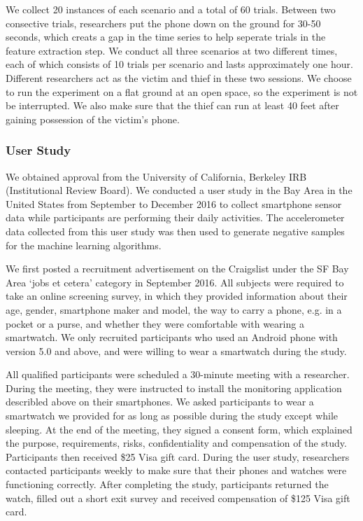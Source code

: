 \documentclass{soups}
\begin{document}
We collect 20 instances of each scenario and a total of 60 trials. Between two consective trials, researchers put the phone down on the ground for 30-50 seconds, which creats a gap in the time series to help seperate trials in the feature extraction step. We conduct all three scenarios at two different times, each of which consists of 10 trials per scenario and lasts approximately one hour. Different researchers act as the victim and thief in these two sessions. We choose to run the experiment on a flat ground at an open space, so the experiment is not be interrupted. We also make sure that the thief can run at least 40 feet after gaining possession of the victim's phone.



\subsubsection{User Study}
We obtained approval from the University of California, Berkeley IRB (Institutional Review Board). We conducted a user study in the Bay Area in the United States from September to December 2016 to collect smartphone sensor data while participants are performing their daily activities. The accelerometer data collected from this user study was then used to generate negative samples for the machine learning algorithms.

We first posted a recruitment advertisement on the Craigslist under the SF Bay Area `jobs et cetera' category in September 2016. All subjects were required to take an online screening survey, in which they provided information about their age, gender, smartphone maker and model, the way to carry a phone, e.g. in a pocket or a purse, and whether they were comfortable with wearing a smartwatch. We only recruited participants who used an Android phone with version 5.0 and above, and were willing to wear a smartwatch during the study.

All qualified participants were scheduled a 30-minute meeting with a researcher. During the meeting, they were instructed to install the monitoring application describled above on their smartphones. We asked participants to wear a smartwatch we provided for as long as possible during the study except while sleeping. At the end of the meeting, they signed a consent form, which explained the purpose, requirements, risks, confidentiality and compensation of the study. Participants then received \$25 Visa gift card. During the user study, researchers contacted participants weekly to make sure that their phones and watches were functioning correctly. After completing the study, participants returned the watch, filled out a short exit survey and received compensation of \$125 Visa gift card.
\end{document}
